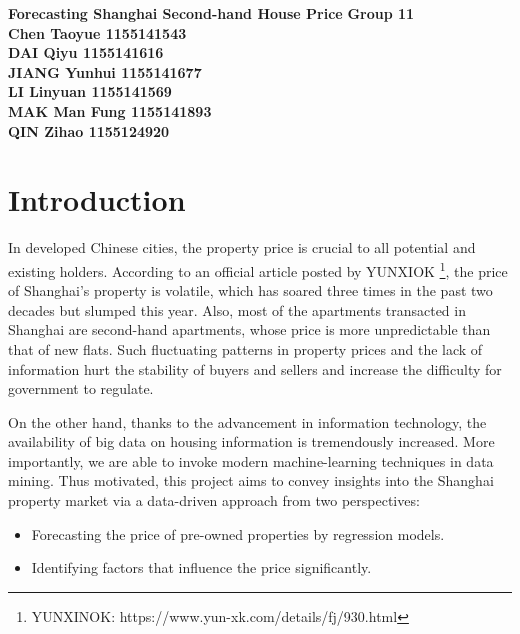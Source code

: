 \documentclass[11pt,a4paper]{article}
\begin{document}
\begin{center}
\huge\textbf{Forecasting Shanghai Second-hand House Price}
\large\textbf{Group 11 \\
Chen Taoyue 1155141543  \\
DAI Qiyu 1155141616\\
JIANG Yunhui 1155141677 \\
LI Linyuan 1155141569 \\
MAK Man Fung 1155141893 \\
QIN Zihao 1155124920 }
\date{}
\end{center}
\tableofcontents
\thispagestyle{empty}
\newpage
	\doublespacing
	\setcounter{page}{1}
	\section{Introduction} 
    In developed Chinese cities, the property price is crucial to all potential and existing holders. According to an official article posted by YUNXIOK \footnote{YUNXINOK: https://www.yun-xk.com/details/fj/930.html}, the price of Shanghai's property is volatile, which has soared three times in the past two decades but slumped this year. Also, most of the apartments transacted in Shanghai are second-hand apartments, whose price is more unpredictable than that of new flats. Such fluctuating patterns in property prices and the lack of information hurt the stability of buyers and sellers and increase the difficulty for government to regulate.
	
	On the other hand, thanks to the advancement in information technology, the availability of big data on housing information is tremendously increased. More importantly, we are able to invoke modern machine-learning techniques in data mining. Thus motivated, this project aims to convey insights into the Shanghai property market via a data-driven approach from two perspectives: 
	\begin{itemize}
	  \item Forecasting the price of pre-owned properties by regression models.
    \item Identifying factors that influence the price significantly.
	\end{itemize}
\end{document}
